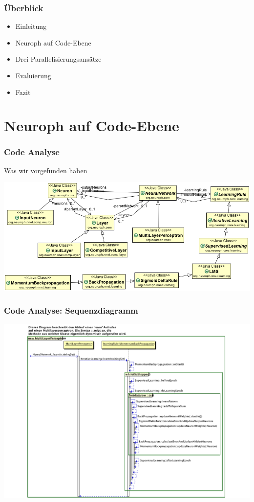 \documentclass[18pt]{beamer}
\begin{document}
	\begin{frame}[c]\frametitle{Überblick}
		\begin{itemize}
		   \item Einleitung \checkmark
		   \item Neuroph auf Code-Ebene 
		   \item Drei Parallelisierungsansätze
		   \item Evaluierung
		   \item Fazit
		\end{itemize}
	\end{frame}
	
	\section{Neuroph auf Code-Ebene}
	\begin{frame}[c]\frametitle{Code Analyse}
		\begin{block}{Was wir vorgefunden haben}
			\begin{center}
				\includegraphics[scale=0.4]{images/Klassendiagramm.png}
			\end{center}
		\end{block}
	\end{frame}
	
	\begin{frame}[c]\frametitle{Code Analyse: Sequenzdiagramm}
			\begin{center}
			  \includegraphics[scale=0.4]{images/Learn.pdf} 
			\end{center}
	\end {frame}			
	
\end{document}
